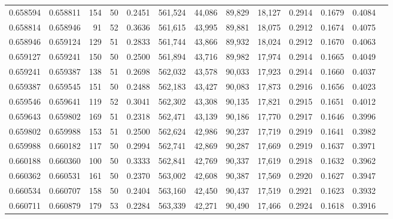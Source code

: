 \begin{tabular}{rrrrrrrrrrrrr}
0.658594 & 0.658811 &   154 &  50 &                                     0.2451 & 561,524 &  44,086 &  89,829 &  18,127 & 0.2914 & 0.1679 & 0.4084 \\
0.658814 & 0.658946 &    91 &  52 &                                     0.3636 & 561,615 &  43,995 &  89,881 &  18,075 & 0.2912 & 0.1674 & 0.4075 \\
0.658946 & 0.659124 &   129 &  51 &                                     0.2833 & 561,744 &  43,866 &  89,932 &  18,024 & 0.2912 & 0.1670 & 0.4063 \\
0.659127 & 0.659241 &   150 &  50 &                                     0.2500 & 561,894 &  43,716 &  89,982 &  17,974 & 0.2914 & 0.1665 & 0.4049 \\
0.659241 & 0.659387 &   138 &  51 &                                     0.2698 & 562,032 &  43,578 &  90,033 &  17,923 & 0.2914 & 0.1660 & 0.4037 \\
0.659387 & 0.659545 &   151 &  50 &                                     0.2488 & 562,183 &  43,427 &  90,083 &  17,873 & 0.2916 & 0.1656 & 0.4023 \\
0.659546 & 0.659641 &   119 &  52 &                                     0.3041 & 562,302 &  43,308 &  90,135 &  17,821 & 0.2915 & 0.1651 & 0.4012 \\
0.659643 & 0.659802 &   169 &  51 &                                     0.2318 & 562,471 &  43,139 &  90,186 &  17,770 & 0.2917 & 0.1646 & 0.3996 \\
0.659802 & 0.659988 &   153 &  51 &                                     0.2500 & 562,624 &  42,986 &  90,237 &  17,719 & 0.2919 & 0.1641 & 0.3982 \\
0.659988 & 0.660182 &   117 &  50 &                                     0.2994 & 562,741 &  42,869 &  90,287 &  17,669 & 0.2919 & 0.1637 & 0.3971 \\
0.660188 & 0.660360 &   100 &  50 &                                     0.3333 & 562,841 &  42,769 &  90,337 &  17,619 & 0.2918 & 0.1632 & 0.3962 \\
0.660362 & 0.660531 &   161 &  50 &                                     0.2370 & 563,002 &  42,608 &  90,387 &  17,569 & 0.2920 & 0.1627 & 0.3947 \\
0.660534 & 0.660707 &   158 &  50 &                                     0.2404 & 563,160 &  42,450 &  90,437 &  17,519 & 0.2921 & 0.1623 & 0.3932 \\
0.660711 & 0.660879 &   179 &  53 &                                     0.2284 & 563,339 &  42,271 &  90,490 &  17,466 & 0.2924 & 0.1618 & 0.3916 \\

\end{tabular}
